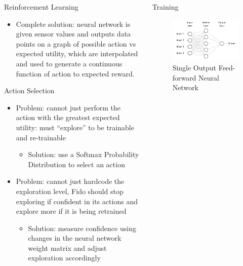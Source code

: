 \documentclass[final]{beamer}
\newlength{\onecolwid}
\newlength{\twocolwid}
\begin{document}
\begin{frame}[t]
\begin{columns}[t]
\begin{column}{\twocolwid}
\begin{columns}[t,totalwidth=\twocolwid]
\begin{column}{\onecolwid}
\begin{block}{Reinforcement Learning}
\begin{itemize}
				\item Complete solution: neural network is given sensor values and outputs data points on a graph of possible action vs expected utility, which are interpolated and used to generate a continuous function of action to expected reward.
			\end{itemize}
			\vspace{-1.25cm}
		\end{block}
		\begin{block}{Action Selection}
			\begin{itemize}
				\item Problem: cannot just perform the action with the greatest expected utility: must ``explore'' to be trainable and re-trainable
				\begin{itemize}
					\item Solution: use a Softmax Probability Distribution to select an action
				\end{itemize}
				\item Problem: cannot just hardcode the exploration level, Fido should stop exploring if confident in its actions and explore more if it is being retrained
				\begin{itemize}
					\item Solution: measure confidence using changes in the neural network weight matrix and adjust exploration accordingly
				\end{itemize}
			\end{itemize}
		\end{block}
	\end{column}

	\begin{column}{\onecolwid}\begin{block}{Training}

	\begin{figure}
		\centering
		\includegraphics[width=.8\linewidth]{Figures/FeedForwardRendered}
		\caption{Single Output Feed-forward Neural Network}
		\label{fig:feedforward}
	\end{figure}


\end{block}
\end{column}
\end{columns}
\end{column}
\end{columns}
\end{frame}
\end{document}
